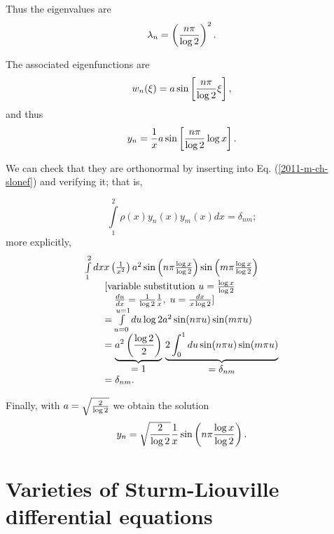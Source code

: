 {Thus the eigenvalues are
\begin{equation}
\lambda_n=
\left({n\pi\over\log2}\right)^2.
\end{equation}

The associated eigenfunctions are
\begin{equation}
w _n(\xi)=a\sin\left[{n\pi\over\log2}
\xi\right],
\end{equation}
and thus
\begin{equation}
y_n={1\over x}a\sin\left[{n\pi\over\log2}
\log x\right].
\end{equation}

We can check that they are orthonormal by inserting into Eq. (\ref{2011-m-ch-slonef})
and verifying it; that is,

\begin{equation}
\int\limits_1^2 \rho (x)y_n(x)
y_m(x)dx=\delta_{nm};
\end{equation}
more explicitly,
\begin{equation}
\begin{array}  {l}
\int\limits_1^2 dx x\left({1\over x^2}\right)a^2
   \sin\left(n\pi{\log x\over\log2}\right)\sin\left(m\pi
   {\log x\over\log2}\right)\\
\qquad \textrm{[variable substitution } u={\log x\over\log2}\\
\qquad \quad {du\over dx}=
{1\over\log2}{1\over x},\; u={dx\over x\log2} \textrm{]}\\
\qquad =
\int\limits_{u=0}^{u=1}
  du\log2a^2\sin(n\pi u)\sin(m\pi u)\\
\qquad =
\underbrace{a^2\left({\log2\over2}\right)}_{\mbox{$=1$}}\,
\underbrace{2 \int_0^1du \sin(n\pi u)\sin(m\pi
u)}_{\mbox{$=\delta_{nm}$}}\\
\qquad = \delta_{nm}.
\end{array}
\end{equation}

Finally, with $a=\sqrt{2\over\log 2}$
we obtain the solution
\begin{equation}
y_n=\sqrt{2\over\log2}{1\over x}
\sin\left(n\pi{\log x\over\log2}\right).
\end{equation}

\eexample
}







\section{Varieties of Sturm-Liouville differential equations}

